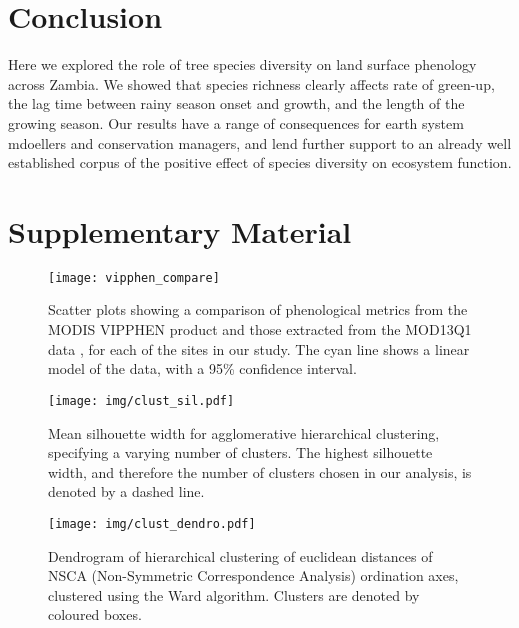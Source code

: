 \documentclass[11pt,a4paper]{article}
\newcommand{\beginsupplement}{%
	\setcounter{table}{0}
	\renewcommand{\thetable}{S\arabic{table}}%
	\setcounter{figure}{0}
	\renewcommand{\thefigure}{S\arabic{figure}}%
	}
\begin{document}
\section{Conclusion}

Here we explored the role of tree species diversity on land surface phenology across Zambia. We showed that species richness clearly affects rate of green-up, the lag time between rainy season onset and growth, and the length of the growing season. Our results have a range of consequences for earth system mdoellers and conservation managers, and lend further support to an already well established corpus of the positive effect of species diversity on ecosystem function.

\printbibliography

\section{Supplementary Material}
\beginsupplement

\begin{figure}[H]
\centering
	\texttt{[image: vipphen\_compare]}
	\caption{Scatter plots showing a comparison of phenological metrics from the MODIS VIPPHEN product \citep{VIPPHEN} and those extracted from the MOD13Q1 data \citep{MOD13Q1}, for each of the sites in our study. The cyan line shows a linear model of the data, with a 95\% confidence interval.}
	\label{vipphen_compare}
\end{figure}





\begin{figure}[H]
\centering
	\texttt{[image: img/clust\_sil.pdf]}
	\caption{Mean silhouette width for agglomerative hierarchical clustering, specifying a varying number of clusters. The highest silhouette width, and therefore the number of clusters chosen in our analysis, is denoted by a dashed line.}
	\label{clust_sil}
\end{figure}

\begin{figure}[H]
\centering
	\texttt{[image: img/clust\_dendro.pdf]}
	\caption{Dendrogram of hierarchical clustering of euclidean distances of NSCA (Non-Symmetric Correspondence Analysis) ordination axes, clustered using the Ward algorithm. Clusters are denoted by coloured boxes.}
	\label{clust_dendro}
\end{figure}


\end{document}
